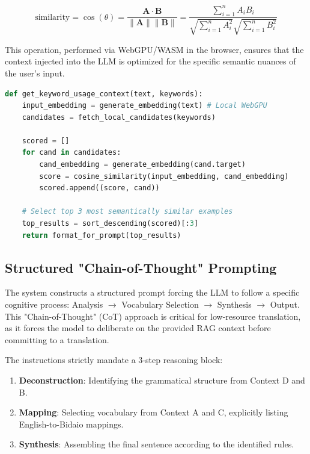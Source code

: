 \documentclass[12pt]{article}
\begin{document}
\begin{equation}
\text{similarity} = \cos(\theta) = \frac{\mathbf{A} \cdot \mathbf{B}}{\|\mathbf{A}\| \|\mathbf{B}\|} = \frac{\sum_{i=1}^{n} A_i B_i}{\sqrt{\sum_{i=1}^{n} A_i^2} \sqrt{\sum_{i=1}^{n} B_i^2}}
\end{equation}

This operation, performed via WebGPU/WASM in the browser, ensures that the context injected into the LLM is optimized for the specific semantic nuances of the user's input.

\begin{lstlisting}[language=Python, basicstyle=\tiny, frame=single, caption={Client-Side Cosine Similarity Re-ranking}]
def get_keyword_usage_context(text, keywords):
    input_embedding = generate_embedding(text) # Local WebGPU
    candidates = fetch_local_candidates(keywords)
    
    scored = []
    for cand in candidates:
        cand_embedding = generate_embedding(cand.target)
        score = cosine_similarity(input_embedding, cand_embedding)
        scored.append((score, cand))
        
    # Select top 3 most semantically similar examples
    top_results = sort_descending(scored)[:3]
    return format_for_prompt(top_results)
\end{lstlisting}



\subsection{Structured "Chain-of-Thought" Prompting}
The system constructs a structured prompt forcing the LLM to follow a specific cognitive process: Analysis $\rightarrow$ Vocabulary Selection $\rightarrow$ Synthesis $\rightarrow$ Output. This "Chain-of-Thought" (CoT) approach is critical for low-resource translation, as it forces the model to deliberate on the provided RAG context before committing to a translation.

The instructions strictly mandate a 3-step reasoning block:
\begin{enumerate}
    \item \textbf{Deconstruction}: Identifying the grammatical structure from Context D and B.
    \item \textbf{Mapping}: Selecting vocabulary from Context A and C, explicitly listing English-to-Bidaio mappings.
    \item \textbf{Synthesis}: Assembling the final sentence according to the identified rules.
\end{enumerate}
\end{document}
